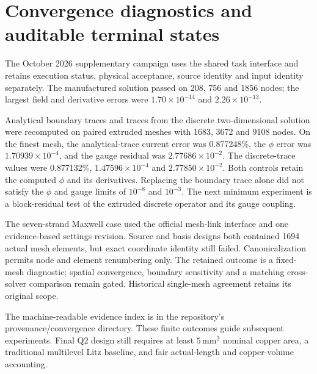 \section{Convergence diagnostics and auditable terminal states}
The October 2026 supplementary campaign uses the shared task interface and retains execution status, physical acceptance, source identity and input identity separately. The manufactured solution passed on 208, 756 and 1856 nodes; the largest field and derivative errors were $1.70\times10^{-14}$ and $2.26\times10^{-13}$.

Analytical boundary traces and traces from the discrete two-dimensional solution were recomputed on paired extruded meshes with 1683, 3672 and 9108 nodes. On the finest mesh, the analytical-trace current error was 0.877248\%, the $\phi$ error was $1.70939\times10^{-4}$, and the gauge residual was $2.77686\times10^{-2}$. The discrete-trace values were 0.877132\%, $1.47596\times10^{-4}$ and $2.77850\times10^{-2}$. Both controls retain the computed $\phi$ and its derivatives. Replacing the boundary trace alone did not satisfy the $\phi$ and gauge limits of $10^{-8}$ and $10^{-3}$. The next minimum experiment is a block-residual test of the extruded discrete operator and its gauge coupling.

The seven-strand Maxwell case used the official mesh-link interface and one evidence-based settings revision. Source and basis designs both contained 1694 actual mesh elements, but exact coordinate identity still failed. Canonicalization permits node and element renumbering only. The retained outcome is a fixed-mesh diagnostic; spatial convergence, boundary sensitivity and a matching cross-solver comparison remain gated. Historical single-mesh agreement retains its original scope.

The machine-readable evidence index is in the repository's provenance/convergence directory. These finite outcomes guide subsequent experiments. Final Q2 design still requires at least $5\,\mathrm{mm^2}$ nominal copper area, a traditional multilevel Litz baseline, and fair actual-length and copper-volume accounting.
